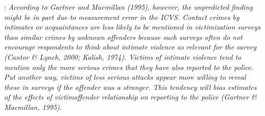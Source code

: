 \documentclass[]{article}
\begin{document}
	\cite{goudriaan2004reporting}: \textit{According to Gartner and Macmillan (1995), however, the unpredicted finding might be in part due to measurement error in the ICVS. Contact crimes by intimates or acquaintances are less likely to be mentioned in victimization surveys than similar crimes by unknown offenders because such surveys often do not encourage respondents to think about intimate violence as relevant for the survey (Cantor \& Lynch, 2000; Kalish, 1974). Victims of intimate violence tend to mention only the more serious crimes that they have also reported to the police. Put another way, victims of less serious attacks appear more willing to reveal these in surveys if the offender was a stranger. This tendency will bias estimates of the effects of victimoffender relationship on reporting to the police (Gartner \& Macmillan, 1995).}
	
\end{document}
